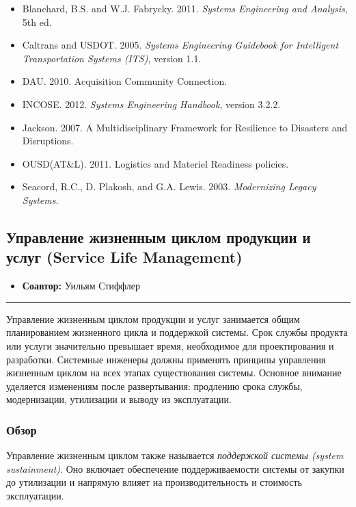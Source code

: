 \documentclass[14pt,a4paper]{extarticle}
\begin{document}
\begin{itemize}
\item Blanchard, B.S. and W.J. Fabrycky. 2011. \textit{Systems Engineering and Analysis}, 5th ed.
\item Caltrans and USDOT. 2005. \textit{Systems Engineering Guidebook for Intelligent Transportation Systems (ITS)}, version 1.1.
\item DAU. 2010. Acquisition Community Connection.
\item INCOSE. 2012. \textit{Systems Engineering Handbook}, version 3.2.2.
\item Jackson. 2007. A Multidisciplinary Framework for Resilience to Disasters and Disruptions.
\item OUSD(AT\&L). 2011. Logistics and Materiel Readiness policies.
\item Seacord, R.C., D. Plakosh, and G.A. Lewis. 2003. \textit{Modernizing Legacy Systems}.
\end{itemize}

\subsection{Управление жизненным циклом продукции и услуг (Service Life Management)}

\begin{itemize}
\item \textbf{Соавтор:} Уильям Стиффлер
\end{itemize}

\hrule

Управление жизненным циклом продукции и услуг занимается общим планированием жизненного цикла и поддержкой системы. Срок службы продукта или услуги значительно превышает время, необходимое для проектирования и разработки. Системные инженеры должны применять принципы управления жизненным циклом на всех этапах существования системы. Основное внимание уделяется изменениям после развертывания: продлению срока службы, модернизации, утилизации и выводу из эксплуатации.

\subsubsection{Обзор}

Управление жизненным циклом также называется \textit{поддержкой системы (system sustainment)}. Оно включает обеспечение поддерживаемости системы от закупки до утилизации и напрямую влияет на производительность и стоимость эксплуатации.
\end{document}
